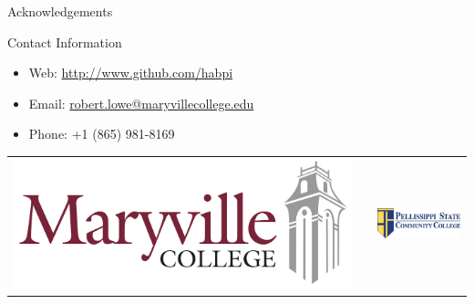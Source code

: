 \documentclass[final]{beamer}
\newlength{\onecolwid}
\begin{document}
\begin{frame}[t]
\begin{columns}[t]
\begin{column}{\onecolwid}

\begin{block}{Acknowledgements}

\small{}

\end{block}



\begin{alertblock}{Contact Information}

\begin{itemize}
\item Web: \href{http://www.github.com/habpi}{http://www.github.com/habpi}
\item Email: \href{mailto:robert.lowe@maryvillecollege.edu}{robert.lowe@maryvillecollege.edu}
\item Phone: +1 (865) 981-8169
\end{itemize}

\end{alertblock}

\begin{center}
\begin{tabular}{ccc}
\includegraphics[width=0.4\linewidth]{Maryville-College.jpg} & \hfill & \includegraphics[width=0.4\linewidth]{pstcc.png}
\end{tabular}
\end{center}


\end{column} %

\end{columns} %

\end{frame} %
\end{document}
